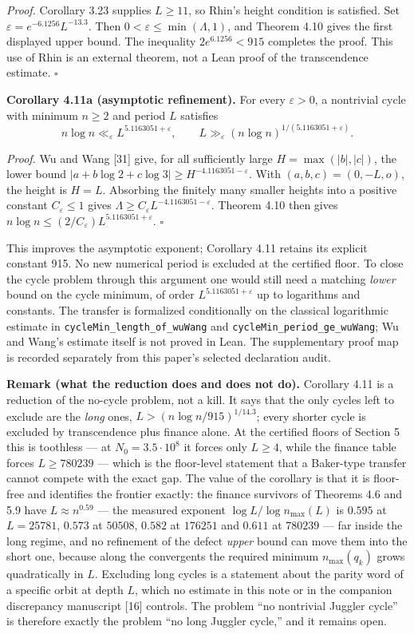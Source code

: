 \documentclass[12pt]{article}
\begin{document}
\emph{Proof.} Corollary 3.23 supplies \(L\ge11\), so Rhin's height
condition is satisfied. Set \(\varepsilon=e^{-6.1256}L^{-13.3}\). Then
\(0<\varepsilon\le\min(\Lambda,1)\), and Theorem 4.10 gives the first
displayed upper bound. The inequality \(2e^{6.1256}<915\) completes the
proof. This use of Rhin is an external theorem, not a Lean proof of the
transcendence estimate. \(\square\)

\textbf{Corollary 4.11a (asymptotic refinement).} For every
\(\varepsilon>0\), a nontrivial cycle with minimum \(n\ge2\) and period
\(L\) satisfies \[
n\log n\ll_\varepsilon L^{5.1163051+\varepsilon},\qquad
L\gg_\varepsilon(n\log n)^{1/(5.1163051+\varepsilon)}.
\]

\emph{Proof.} Wu and Wang {[}31{]} give, for all sufficiently large
\(H=\max(|b|,|c|)\), the lower bound
\(|a+b\log2+c\log3|\ge H^{-4.1163051-\varepsilon}\). With
\((a,b,c)=(0,-L,o)\), the height is \(H=L\). Absorbing the finitely many
smaller heights into a positive constant \(C_\varepsilon\le1\) gives
\(\Lambda\ge C_\varepsilon L^{-4.1163051-\varepsilon}\). Theorem 4.10
then gives \(n\log n\le(2/C_\varepsilon)L^{5.1163051+\varepsilon}\).
\(\square\)

This improves the asymptotic exponent; Corollary 4.11 retains its
explicit constant 915. No new numerical period is excluded at the
certified floor. To close the cycle problem through this argument one
would still need a matching \emph{lower} bound on the cycle minimum, of
order \(L^{5.1163051+\varepsilon}\) up to logarithms and constants. The
transfer is formalized conditionally on the classical logarithmic
estimate in \texttt{\nolinkurl{cycleMin_length_of_wuWang}} and
\texttt{\nolinkurl{cycleMin_period_ge_wuWang}}; Wu and Wang's estimate
itself is not proved in Lean. The supplementary proof map is recorded
separately from this paper's selected declaration audit.

\textbf{Remark (what the reduction does and does not do).} Corollary
4.11 is a reduction of the no-cycle problem, not a kill. It says that
the only cycles left to exclude are the \emph{long} ones,
\(L>(n\log n/915)^{1/14.3}\); every shorter cycle is excluded by
transcendence plus finance alone. At the certified floors of Section 5
this is toothless --- at \(N_0=3.5\cdot 10^8\) it forces only
\(L\ge 4\), while the finance table forces \(L\ge 780239\) --- which is
the floor-level statement that a Baker-type transfer cannot compete with
the exact gap. The value of the corollary is that it is floor-free and
identifies the frontier exactly: the finance survivors of Theorems 4.6
and 5.9 have \(L\approx n^{0.59}\) --- the measured exponent
\(\log L/\log n_{\max}(L)\) is \(0.595\) at \(L=25781\), \(0.573\) at
\(50508\), \(0.582\) at \(176251\) and \(0.611\) at \(780239\) --- far
inside the long regime, and no refinement of the defect \emph{upper}
bound can move them into the short one, because along the convergents
the required minimum \(n_{\max}(q_k)\) grows quadratically in \(L\).
Excluding long cycles is a statement about the parity word of a specific
orbit at depth \(L\), which no estimate in this note or in the companion
discrepancy manuscript {[}16{]} controls. The problem ``no nontrivial
Juggler cycle'' is therefore exactly the problem ``no long Juggler
cycle,'' and it remains open.
\end{document}
